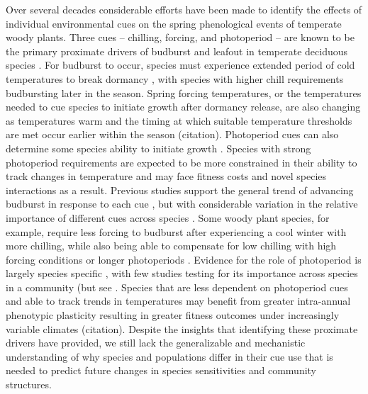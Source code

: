 \documentclass{article}\usepackage[]{graphicx}\usepackage[]{color}
\begin{document}
Over several decades considerable efforts have been made to identify the effects of individual environmental cues on the spring phenological events of temperate woody plants. Three cues -- chilling, forcing, and photoperiod -- are known to be the primary proximate drivers of budburst and leafout in temperate deciduous species \citep{Chuine2016}. For budburst to occur, species must experience extended period of cold temperatures to break dormancy \citep{Cooke2012}, with species with higher chill requirements budbursting later in the season. Spring forcing temperatures, or the temperatures needed to cue species to initiate growth after dormancy release, are also changing as temperatures warm and the timing at which suitable temperature thresholds are met occur earlier within the season (citation). Photoperiod cues can also determine some species ability to initiate growth \citep{Basler2014,Zohner2020}. Species with strong photoperiod requirements are expected to be more constrained in their ability to track changes in temperature and may face fitness costs and novel species interactions as a result. Previous studies support the general trend of advancing budburst in response to each cue \citep{Flynn2018}, but with considerable variation in the relative importance of different cues across species \citep{Chuine2016,Flynn2018}. Some woody plant species, for example, require less forcing to budburst after experiencing a cool winter with more chilling, while also being able to compensate for low chilling with high forcing conditions or longer photoperiods \citep{Laube2014,Harrington2015,Flynn2018,Caffarra2011,Basler2014,Zohner2016}. Evidence for the role of photoperiod is largely species specific  \citep{Heide1993, Basler2014, Singh2017, Zohner2016}, with few studies testing for its importance across species in a community (but see  \cite{Flynn2018}. Species that are less dependent on photoperiod cues and able to track trends in temperatures may benefit from greater intra-annual phenotypic plasticity resulting in greater fitness outcomes under increasingly variable climates (citation). Despite the insights that identifying these proximate drivers have provided, we still lack the generalizable and mechanistic understanding of why species and populations differ in their cue use that is needed to predict future changes in species sensitivities and community structures.
\end{document}
